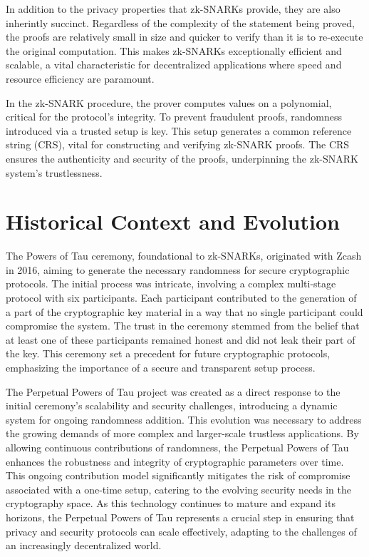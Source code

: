 \documentclass[11pt]{article}
\begin{document}
In addition to the privacy properties that zk-SNARKs provide, they are also inherintly succinct. Regardless of the complexity of the statement being proved, the proofs are relatively small in size and quicker to verify than it is to re-execute the original computation. This makes zk-SNARKs exceptionally efficient and scalable, a vital characteristic for decentralized applications where speed and resource efficiency are paramount.

In the zk-SNARK procedure, the prover computes values on a polynomial, critical for the protocol's integrity. To prevent fraudulent proofs, randomness introduced via a trusted setup is key. This setup generates a common reference string (CRS), vital for constructing and verifying zk-SNARK proofs. The CRS ensures the authenticity and security of the proofs, underpinning the zk-SNARK system's trustlessness.
\section{Historical Context and Evolution}
\label{sec:org2725b7e}

The Powers of Tau ceremony, foundational to zk-SNARKs, originated with Zcash in 2016, aiming to generate the necessary randomness for secure cryptographic protocols. The initial process was intricate, involving a complex multi-stage protocol with six participants. Each participant contributed to the generation of a part of the cryptographic key material in a way that no single participant could compromise the system. The trust in the ceremony stemmed from the belief that at least one of these participants remained honest and did not leak their part of the key. This ceremony set a precedent for future cryptographic protocols, emphasizing the importance of a secure and transparent setup process.

The Perpetual Powers of Tau project was created as a direct response to the initial ceremony's scalability and security challenges, introducing a dynamic system for ongoing randomness addition. This evolution was necessary to address the growing demands of more complex and larger-scale trustless applications. By allowing continuous contributions of randomness, the Perpetual Powers of Tau enhances the robustness and integrity of cryptographic parameters over time. This ongoing contribution model significantly mitigates the risk of compromise associated with a one-time setup, catering to the evolving security needs in the cryptography space. As this technology continues to mature and expand its horizons, the Perpetual Powers of Tau represents a crucial step in ensuring that privacy and security protocols can scale effectively, adapting to the challenges of an increasingly decentralized world.
\end{document}
